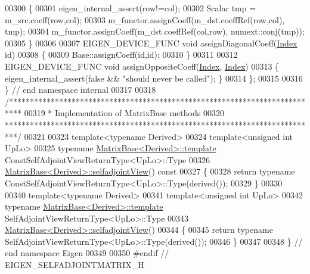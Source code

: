 \begin{DoxyCode}
00300   \{
00301     eigen\_internal\_assert(row!=col);
00302     Scalar tmp = m\_src.coeff(row,col);
00303     m\_functor.assignCoeff(m\_dst.coeffRef(row,col), tmp);
00304     m\_functor.assignCoeff(m\_dst.coeffRef(col,row), numext::conj(tmp));
00305   \}
00306   
00307   EIGEN\_DEVICE\_FUNC \textcolor{keywordtype}{void} assignDiagonalCoeff(\hyperlink{group___core___module_a554f30542cc2316add4b1ea0a492ff02}{Index} \textcolor{keywordtype}{id})
00308   \{
00309     Base::assignCoeff(\textcolor{keywordtype}{id},\textcolor{keywordtype}{id});
00310   \}
00311   
00312   EIGEN\_DEVICE\_FUNC \textcolor{keywordtype}{void} assignOppositeCoeff(\hyperlink{group___core___module_a554f30542cc2316add4b1ea0a492ff02}{Index}, \hyperlink{group___core___module_a554f30542cc2316add4b1ea0a492ff02}{Index})
00313   \{ eigen\_internal\_assert(\textcolor{keyword}{false} && \textcolor{stringliteral}{"should never be called"}); \}
00314 \};
00315 
00316 \} \textcolor{comment}{// end namespace internal}
00317 
00318 \textcolor{comment}{/***************************************************************************}
00319 \textcolor{comment}{* Implementation of MatrixBase methods}
00320 \textcolor{comment}{***************************************************************************/}
00321 
00323 \textcolor{keyword}{template}<\textcolor{keyword}{typename} Derived>
00324 \textcolor{keyword}{template}<\textcolor{keywordtype}{unsigned} \textcolor{keywordtype}{int} UpLo>
00325 \textcolor{keyword}{typename} \hyperlink{group___core___module_class_eigen_1_1_matrix_base}{MatrixBase<Derived>::template} 
      ConstSelfAdjointViewReturnType<UpLo>::Type
00326 \hyperlink{group___core___module_class_eigen_1_1_matrix_base}{MatrixBase<Derived>::selfadjointView}()\textcolor{keyword}{ const}
00327 \textcolor{keyword}{}\{
00328   \textcolor{keywordflow}{return} \textcolor{keyword}{typename} ConstSelfAdjointViewReturnType<UpLo>::Type(derived());
00329 \}
00330 
00340 \textcolor{keyword}{template}<\textcolor{keyword}{typename} Derived>
00341 \textcolor{keyword}{template}<\textcolor{keywordtype}{unsigned} \textcolor{keywordtype}{int} UpLo>
00342 \textcolor{keyword}{typename} \hyperlink{group___core___module_class_eigen_1_1_matrix_base}{MatrixBase<Derived>::template} SelfAdjointViewReturnType<UpLo>::Type
00343 \hyperlink{group___core___module_class_eigen_1_1_matrix_base}{MatrixBase<Derived>::selfadjointView}()
00344 \{
00345   \textcolor{keywordflow}{return} \textcolor{keyword}{typename} SelfAdjointViewReturnType<UpLo>::Type(derived());
00346 \}
00347 
00348 \} \textcolor{comment}{// end namespace Eigen}
00349 
00350 \textcolor{preprocessor}{#endif // EIGEN\_SELFADJOINTMATRIX\_H}
\end{DoxyCode}
